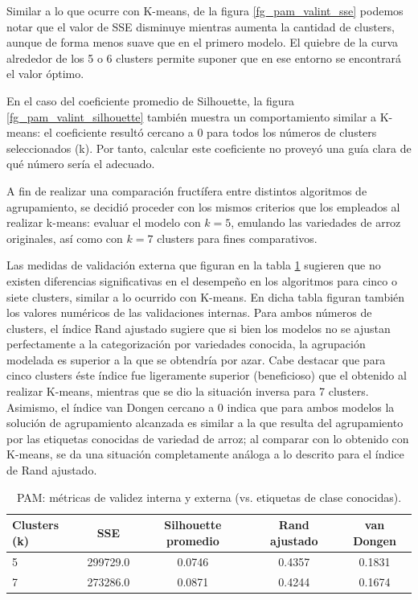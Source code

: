 \documentclass{article}
\begin{document}
Similar a lo que ocurre con K-means, de la figura \ref{fg_pam_valint_sse} podemos notar que el valor de SSE disminuye mientras aumenta la cantidad de clusters, aunque de forma menos suave que en el primero modelo.
El quiebre de la curva alrededor de los 5 o 6 clusters permite suponer que en ese entorno se encontrará el valor óptimo.

En el caso del coeficiente promedio de Silhouette, la figura \ref{fg_pam_valint_silhouette} también muestra un comportamiento similar a K-means: el coeficiente resultó cercano a 0 para todos los números de clusters seleccionados (k).
Por tanto, calcular este coeficiente no proveyó una guía clara de qué número sería el adecuado.

A fin de realizar una comparación fructífera entre distintos algoritmos de agrupamiento, se decidió proceder con los mismos criterios que los empleados al realizar k-means: evaluar el modelo con \(k = 5\), emulando las variedades de arroz originales, así como con \(k = 7\) clusters para fines comparativos. 

Las medidas de validación externa que figuran en la tabla \ref{tab:PAM} sugieren que no existen diferencias significativas en el desempeño en los algoritmos para cinco o siete clusters, similar a lo ocurrido con K-means.
En dicha tabla figuran también los valores numéricos de las validaciones internas.
Para ambos números de clusters, el índice Rand ajustado sugiere que si bien los modelos no se ajustan perfectamente a la categorización por variedades conocida, la agrupación modelada es superior a la que se obtendría por azar. Cabe destacar que para cinco clusters éste índice fue ligeramente superior (beneficioso) que el obtenido al realizar K-means, mientras que se dio la situación inversa para 7 clusters.
Asimismo, el índice van Dongen cercano a 0 indica que para ambos modelos la solución de agrupamiento alcanzada es similar a la que resulta del agrupamiento por las etiquetas conocidas de variedad de arroz; al comparar con lo obtenido con K-means, se da una situación completamente análoga a lo descrito para el índice de Rand ajustado.

\begin{table}[!htb]
  \centering
  \begin{tabular}{lcccc}
    \toprule
    Clusters (k) & SSE & Silhouette promedio & Rand ajustado & van Dongen\\
    \midrule
    5 &  299729.0 &  0.0746&  0.4357& 0.1831\\ 
    7 &  273286.0&  0.0871&  0.4244& 0.1674\\
    \bottomrule
  \end{tabular}
  \caption{PAM: métricas de validez interna y externa (vs. etiquetas de clase conocidas).}
  \label{tab:PAM}
\end{table}
\end{document}
